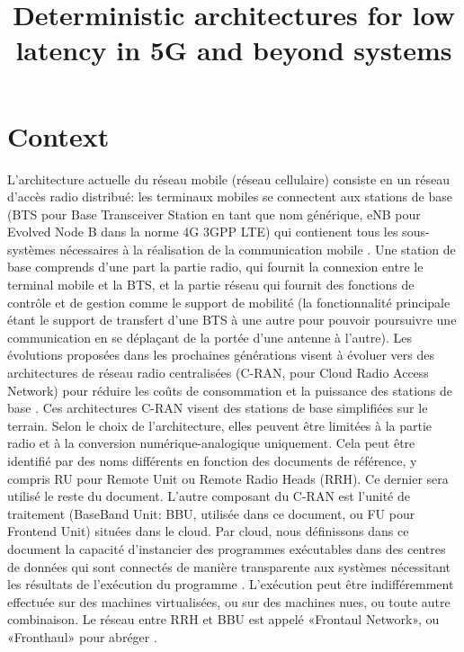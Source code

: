 \documentclass{article}
\begin{document}
\title{Deterministic architectures for low latency in 5G and beyond systems}


\maketitle

\section*{Context}

L'architecture actuelle du réseau mobile (réseau cellulaire) consiste en un réseau d'accès radio distribué: les terminaux mobiles se connectent aux stations de base (BTS pour Base Transceiver Station en tant que nom générique, eNB pour Evolved Node B  dans la norme 4G 3GPP LTE) qui contienent tous les sous-systèmes nécessaires à la réalisation de la communication mobile \cite{bouguen2012lte}. 
Une station de base comprends d'une part la partie radio, qui fournit la connexion entre le terminal mobile et la BTS, et la partie réseau qui fournit des fonctions de contrôle et de gestion comme le support de mobilité (la fonctionnalité principale étant le support de transfert d'une BTS à une autre pour pouvoir poursuivre une communication en se déplaçant de la portée d'une antenne à l'autre). Les évolutions proposées dans les prochaines générations visent à évoluer vers des architectures de réseau radio centralisées (C-RAN, pour Cloud Radio Access Network) pour réduire les coûts de consommation et la puissance des stations de base \cite{mobile2011c}. Ces architectures C-RAN visent des stations de base simplifiées sur le terrain. Selon le choix de l'architecture, elles peuvent être limitées à la partie radio et à la conversion numérique-analogique uniquement. Cela peut être identifié par des noms différents en fonction des documents de référence, y compris RU pour Remote Unit ou Remote Radio Heads (RRH). Ce dernier sera utilisé le reste du document. L'autre composant du C-RAN est l'unité de traitement (BaseBand Unit: BBU, utilisée dans ce document, ou FU pour Frontend Unit) situées dans le cloud. Par cloud, nous définissons dans ce document la capacité d'instancier des programmes exécutables dans des centres de données qui sont connectés de manière transparente aux systèmes nécessitant les résultats de l'exécution du programme \cite{mobile2011c}. L'exécution peut être indifféremment effectuée sur des machines virtualisées, ou sur des machines nues, ou toute autre combinaison. Le réseau entre RRH et BBU est appelé «Frontaul Network», ou «Fronthaul» pour abréger \cite{ieeep802}. \\
\end{document}
